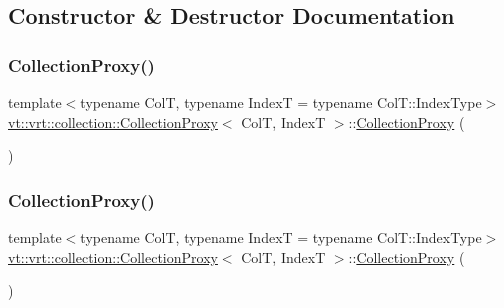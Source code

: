 \subsection{Constructor \& Destructor Documentation}
\mbox{\label{structvt_1_1vrt_1_1collection_1_1_collection_proxy_a5cc052678774abc3b4811f273f0df405}} 
\subsubsection{\texorpdfstring{Collection\+Proxy()}{CollectionProxy()}\hspace{0.1cm}{\footnotesize\ttfamily [1/3]}}
{\footnotesize\ttfamily template$<$typename ColT, typename IndexT = typename Col\+T\+::\+Index\+Type$>$ \\
\hyperlink{structvt_1_1vrt_1_1collection_1_1_collection_proxy}{vt\+::vrt\+::collection\+::\+Collection\+Proxy}$<$ ColT, IndexT $>$\+::\hyperlink{structvt_1_1vrt_1_1collection_1_1_collection_proxy}{Collection\+Proxy} (\begin{DoxyParamCaption}{ }\end{DoxyParamCaption})\hspace{0.3cm}{\ttfamily [default]}}

\mbox{\label{structvt_1_1vrt_1_1collection_1_1_collection_proxy_ae9e5efa3735abd08a7b3d68375447f92}} 
\subsubsection{\texorpdfstring{Collection\+Proxy()}{CollectionProxy()}\hspace{0.1cm}{\footnotesize\ttfamily [2/3]}}
{\footnotesize\ttfamily template$<$typename ColT, typename IndexT = typename Col\+T\+::\+Index\+Type$>$ \\
\hyperlink{structvt_1_1vrt_1_1collection_1_1_collection_proxy}{vt\+::vrt\+::collection\+::\+Collection\+Proxy}$<$ ColT, IndexT $>$\+::\hyperlink{structvt_1_1vrt_1_1collection_1_1_collection_proxy}{Collection\+Proxy} (\begin{DoxyParamCaption}\item[{\hyperlink{structvt_1_1vrt_1_1collection_1_1_collection_proxy}{Collection\+Proxy}$<$ ColT, IndexT $>$ const \&}]{ }\end{DoxyParamCaption})\hspace{0.3cm}{\ttfamily [default]}}

